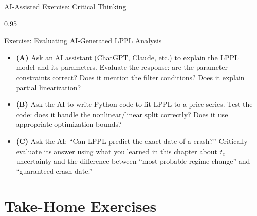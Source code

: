 \documentclass[9pt, aspectratio=169, t]{beamer}
\begin{document}
\begin{frame}{AI-Assisted Exercise: Critical Thinking}
    \begin{cminipage}{0.95\textwidth}
    \begin{block}{Exercise: Evaluating AI-Generated LPPL Analysis}
        {\small
        \begin{itemize}\setlength{\itemsep}{3pt}
            \item \textcolor{MainBlue}{\textbf{(A)}} Ask an AI assistant (ChatGPT, Claude, etc.) to explain the LPPL model and its parameters. Evaluate the response: are the parameter constraints correct? Does it mention the filter conditions? Does it explain partial linearization?
            \item \textcolor{MainBlue}{\textbf{(B)}} Ask the AI to write Python code to fit LPPL to a price series. Test the code: does it handle the nonlinear/linear split correctly? Does it use appropriate optimization bounds?
            \item \textcolor{MainBlue}{\textbf{(C)}} Ask the AI: ``Can LPPL predict the exact date of a crash?'' Critically evaluate its answer using what you learned in this chapter about $t_c$ uncertainty and the difference between ``most probable regime change'' and ``guaranteed crash date.''
        \end{itemize}
        }
    \end{block}
    \end{cminipage}
\end{frame}

\section{Take-Home Exercises}
\end{document}
